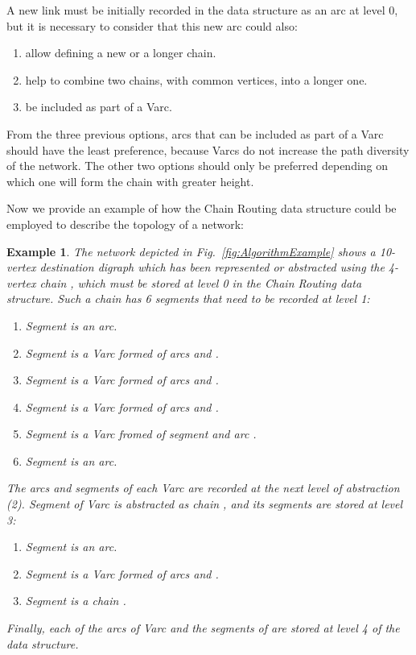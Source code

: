 \documentclass[5p,twocolumn]{elsarticle}
\newtheorem{example}{Example}
\begin{document}
A new link must be initially recorded in the data structure as an arc at level 0, but it is necessary to consider that this new arc could also:

\begin{enumerate}
	\item allow defining a new or a longer chain.
	\item help to combine two chains, with common vertices, into a longer one.
	\item be included as part of a Varc.
\end{enumerate}

From the three previous options, arcs that can be included as part of a Varc should have the least preference, because Varcs do not increase the path diversity of the network. The other two options should only be preferred depending on which one will form the chain with greater height.

Now we provide an example of how the Chain Routing data structure could be employed to describe the topology of a network:

\begin{example}
The network depicted in Fig.\ \ref{fig:AlgorithmExample} shows a 10-vertex destination digraph which has been represented or abstracted using the 4-vertex chain , which must be stored at level 0 in the Chain Routing data structure. Such a chain has 6 segments that need to be recorded at level 1:

\begin{enumerate}
	\item Segment  is an arc.
	\item Segment  is a Varc formed of arcs  and .
	\item Segment  is a Varc formed of arcs  and .
	\item Segment  is a Varc formed of arcs  and .
	\item Segment  is a Varc fromed of segment  and arc .
	\item Segment  is an arc.
\end{enumerate}

The arcs and segments of each Varc are recorded at the next level of abstraction (2). Segment  of Varc  is abstracted as chain , and its segments are stored at level 3:

\begin{enumerate}
	\item Segment  is an arc.
	\item Segment  is a Varc formed of arcs  and .
	\item Segment  is a chain .
\end{enumerate}

Finally, each of the arcs of Varc  and the segments of  are stored at level 4 of the data structure.
\end{example}
\end{document}
